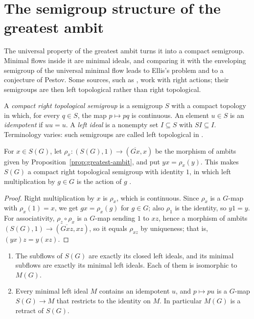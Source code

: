 \section{The semigroup structure of the greatest ambit}\label{sec:semigroup}

The universal property of the greatest ambit turns it into a compact
semigroup. Minimal flows inside it are minimal ideals, and comparing it with
the enveloping semigroup of the universal minimal flow leads to Ellis's
problem and to a conjecture of Pestov. Some sources, such as
\cite{BartosovaZucker2019}, work with right actions; their semigroups are then
left topological rather than right topological.

\begin{definition}\label{def:rt-semigroup}
A \emph{compact right topological semigroup} is a semigroup $S$ with a compact
topology in which, for every $q\in S$, the map $p\mapsto pq$ is continuous. An
element $u\in S$ is an \emph{idempotent} if $uu=u$. A \emph{left ideal} is a
nonempty set $I\subseteq S$ with $SI\subseteq I$. Terminology varies: such
semigroups are called left topological in \cite{Uspenskij2000}.
\end{definition}

\begin{proposition}\label{prop:ambit-semigroup}
For $x\in S(G)$, let $\rho_x\colon(S(G),1)\to(\overline{Gx},x)$ be the morphism
of ambits given by Proposition~\ref{prop:greatest-ambit}, and put
$yx=\rho_x(y)$. This makes $S(G)$ a compact right topological semigroup with
identity $1$, in which left multiplication by $g\in G$ is the action of $g$
\cite[Theorem~3.1]{Uspenskij2000}.
\end{proposition}

\begin{proof}
Right multiplication by $x$ is $\rho_x$, which is continuous. Since $\rho_x$ is
a $G$-map with $\rho_x(1)=x$, we get $gx=\rho_x(g)$ for $g\in G$; also
$\rho_1$ is the identity, so $y1=y$. For associativity, $\rho_z\circ\rho_x$ is
a $G$-map sending $1$ to $xz$, hence a morphism of ambits
$(S(G),1)\to(\overline{Gxz},xz)$, so it equals $\rho_{xz}$ by uniqueness;
that is, $(yx)z=y(xz)$.
\end{proof}

\begin{proposition}\label{prop:minimal-ideals}
\begin{enumerate}
\item The subflows of $S(G)$ are exactly its closed left ideals, and its
  minimal subflows are exactly its minimal left ideals. Each of them is
  isomorphic to $M(G)$.
\item Every minimal left ideal $M$ contains an idempotent $u$, and
  $p\mapsto pu$ is a $G$-map $S(G)\to M$ that restricts to the identity on
  $M$. In particular $M(G)$ is a retract of $S(G)$.
\end{enumerate}
\end{proposition}

